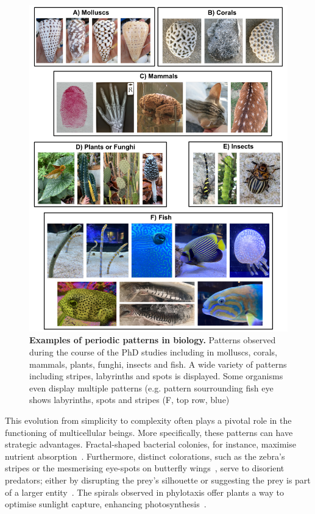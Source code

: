 \begin{figure}[h!]
    \centering
    \includegraphics[width=1\textwidth]{chapters/Introduction/pattern_examples}
    \caption{\textbf{Examples of periodic patterns in biology.} Patterns observed during the course of the PhD studies including in molluscs, corals, mammals, plants, funghi, insects and fish. A wide variety of patterns including stripes, labyrinths and spots is displayed. Some organisms even display multiple patterns (e.g. pattern sourrounding fish eye shows labyrinths, spots and stripes (F, top row, blue)}
    \label{fig:pattern_examples}
\end{figure}
This evolution from simplicity to complexity often plays a pivotal role in the functioning of multicellular beings.
More specifically, these patterns can have strategic advantages.
Fractal-shaped bacterial colonies, for instance, maximise nutrient absorption~\parencite{Matsushita1990}.
Furthermore, distinct colorations, such as the zebra's stripes or the mesmerising eye-spots on butterfly wings~\parencite{Blest}, serve to disorient predators; either by disrupting the prey's silhouette or suggesting the prey is part of a larger entity~\parencite{Stevens2006}.
The spirals observed in phylotaxis offer plants a way to optimise sunlight capture, enhancing photosynthesis~\parencite{Strauss2020}.

